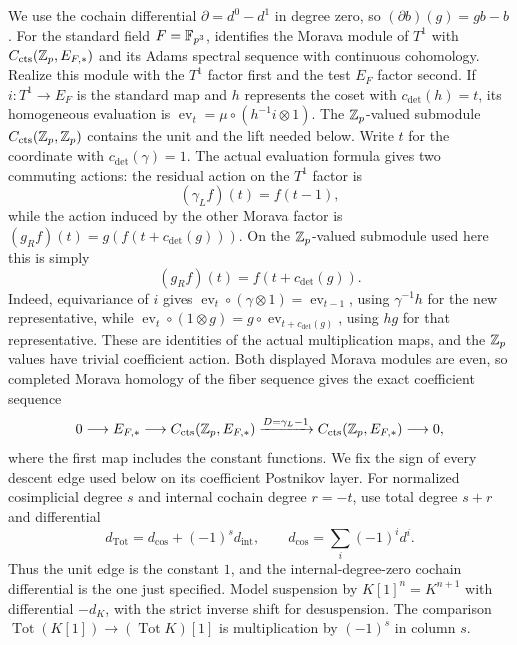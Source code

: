 We use the cochain differential \(\partial=d^0-d^1\) in degree zero,
so \((\partial b)(g)=g b-b\).  For the standard field \(F=\mathbb F_{p^3}\),
\cite[Theorem~2(i)--(ii)]{DevinatzHopkins} identifies the Morava module
of \(T^1\) with \(C_{\mathrm{cts}}(\mathbb Z_p,E_{F,*})\) and its Adams
spectral sequence with continuous cohomology.  Realize this module with
the \(T^1\) factor first and the test \(E_F\) factor second.  If
\(i:T^1\to E_F\) is the standard map and \(h\) represents the coset with
\(c_{\mathrm{det}}(h)=t\), its homogeneous evaluation is
\(\operatorname{ev}_t=\mu\circ(h^{-1}i\otimes1)\).
The \(\mathbb Z_p\)-valued submodule \(C_{\mathrm{cts}}(\mathbb Z_p,\mathbb Z_p)\) contains
the unit and the lift needed below.  Write \(t\) for the coordinate
with \(c_{\mathrm{det}}(\gamma)=1\).  The actual evaluation formula gives two commuting
actions: the residual action on the \(T^1\) factor is
\[
 (\gamma_L f)(t)=f(t-1),
\]
while the action induced by the other Morava factor is
\((g_R f)(t)=g(f(t+c_{\mathrm{det}}(g)))\).  On the \(\mathbb Z_p\)-valued submodule used
here this is simply
\[
 (g_R f)(t)=f(t+c_{\mathrm{det}}(g)).
\]
Indeed, equivariance of \(i\) gives
\(\operatorname{ev}_t\circ(\gamma\otimes1)=\operatorname{ev}_{t-1}\),
using \(\gamma^{-1}h\) for the new representative, while
\(\operatorname{ev}_t\circ(1\otimes g)
 =g\circ\operatorname{ev}_{t+c_{\mathrm{det}}(g)}\), using \(hg\) for that
representative.  These are identities of the actual multiplication
maps, and the \(\mathbb Z_p\) values have trivial coefficient action.
Both displayed Morava modules are even,
so completed Morava homology of the fiber sequence gives the exact
coefficient sequence
\[
 0\longrightarrow E_{F,*}\longrightarrow
 C_{\mathrm{cts}}(\mathbb Z_p,E_{F,*})
 \xrightarrow{D=\gamma_L-1}
 C_{\mathrm{cts}}(\mathbb Z_p,E_{F,*})\longrightarrow0,
\]
where the first map includes the constant functions.  We fix the sign of every descent edge used below on its coefficient
Postnikov layer.  For normalized cosimplicial degree \(s\) and internal
cochain degree \(r=-t\), use total degree \(s+r\) and differential
\[
 d_{\mathrm{Tot}}=d_{\mathrm{cos}}+(-1)^s d_{\mathrm{int}},
 \qquad d_{\mathrm{cos}}=\sum_i(-1)^i d^i.
\]
Thus the unit edge is the constant \(1\), and the internal-degree-zero
cochain differential is the one just specified.  Model suspension by
\(K[1]^n=K^{n+1}\) with differential \(-d_K\), with the strict inverse
shift for desuspension.  The comparison
\(\operatorname{Tot}(K[1])\to(\operatorname{Tot}K)[1]\) is
multiplication by \((-1)^s\) in column \(s\).

